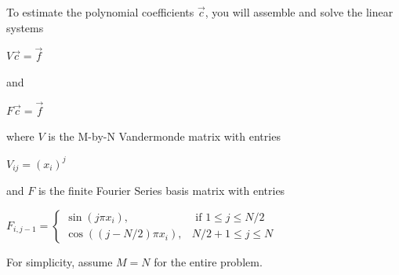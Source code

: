 \documentclass[10pt]{article}
\begin{document}
To estimate the polynomial coefficients $\vec{c}$, you will assemble and solve the linear systems

\begin{center}
$V\vec{c}=\vec{f}$
\end{center}

and

\begin{center}
$F\vec{c}=\vec{f}$
\end{center}

where $V$ is the M-by-N Vandermonde matrix with entries

\begin{center}
$V_{ij}=(x_i)^j$
\end{center}

and $F$ is the finite Fourier Series basis matrix with entries

\begin{center}
$F_{i, j-1}=\left\{
    \begin{array}{ll}
        \sin \left(j \pi x_{i}\right), & \text { if } 1 \leq j \leq N / 2 \\
        \cos \left((j-N / 2) \pi x_{i}\right), & N / 2+1 \leq j \leq N
    \end{array}
\right.$
\end{center}

For simplicity, assume $M=N$ for the entire problem.
\end{document}

